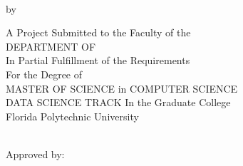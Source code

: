 %
%
%

\pagestyle{empty}
\begin{center}
	{{\bfseries\large{\MakeUppercase{\thesisTitle} \\}}\par}
	\vspace*{5mm}
	{by\\\vspace*{2mm}\textsc{\thesisBy}\par}
	\vspace*{5mm}
	A Project Submitted to the Faculty of the \\
	DEPARTMENT OF {\MakeUppercase{\thesisDegreeDepartment}}\\
	In Partial Fulfillment of the Requirements\\
	For the Degree of\\
	MASTER OF SCIENCE in COMPUTER SCIENCE\\ 
	DATA SCIENCE TRACK
	In the Graduate College\\\vspace*{1.5mm}
	Florida Polytechnic University\\\vspace*{5mm}
	\small  \thesisDate \\\vspace*{1.5mm}
	\vfill
	\begin{flushleft}
		Approved by:\\
	\end{flushleft}
\end{center}
\pagebreak